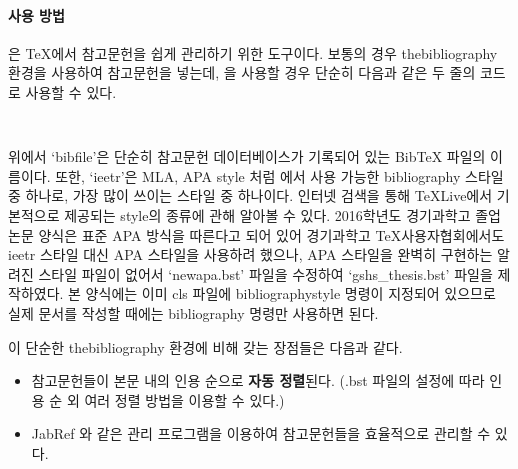 \paragraph{ 사용 방법}
 은 \TeX 에서 참고문헌을 쉽게 관리하기 위한 도구이다. 보통의 
경우 thebibliography 환경을 사용하여 참고문헌을 넣는데, 을 
사용할 경우 단순히 다음과 같은 두 줄의 코드로 사용할 수 있다. 
\begin{lstlisting}


\end{lstlisting}
위에서 `bibfile'은 단순히 참고문헌 데이터베이스가 기록되어 있는 BibTeX 파일의 
이름이다. 또한, `ieetr'은 MLA, APA style 처럼  에서 사용 
가능한 bibliography 스타일 중 하나로, 가장 많이 쓰이는 스타일 중 하나이다. 
인터넷 검색을 통해 TeXLive에서 기본적으로 제공되는  style의 
종류에 관해 알아볼 수 있다. 2016학년도 경기과학고 졸업논문 양식은 표준 APA 
방식을 따른다고 되어 있어 경기과학고 \TeX 사용자협회에서도 ieetr 스타일 대신 
APA 스타일을 사용하려 했으나, APA 스타일을 완벽히 구현하는 알려진 스타일 파일이 
없어서 `newapa.bst' 파일을 수정하여 `gshs\_thesis.bst' 파일을 제작하였다.
본 양식에는 이미 cls 파일에 bibliographystyle 명령이 지정되어 있으므로 실제 
문서를 작성할 때에는 bibliography 명령만 사용하면 된다.

이 단순한 thebibliography 환경에 비해 갖는 장점들은 다음과 같다.
\begin{itemize}
	\item 참고문헌들이 본문 내의 인용 순으로 {\bf 자동 정렬}된다. (.bst 
	파일의 설정에 따라 인용 순 외 여러 정렬 방법을 이용할 수 있다.)
	\item JabRef 와 같은  관리 프로그램을 이용하여 
	참고문헌들을 효율적으로 관리할 수 있다.
\end{itemize}

